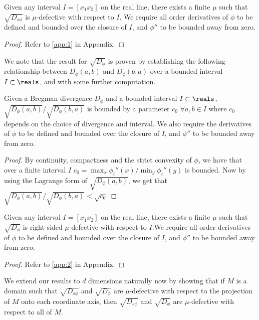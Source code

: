 \documentclass[11pt]{myclass}
\newcommand{\breg}{\ensuremath{D_\phi}}
\newcommand{\sbreg}{\ensuremath{D_{s\phi}}}
\begin{document}
\begin{lemma}\label{Arootmu}
Given any interval $I=[x_1 x_2]$ on the real line, there exists a finite $\mu$ such that  $\sqrt{\sbreg}$ is $\mu$-defective with respect to $I$. We require 
all order derivatives of $\phi$ to be defined and bounded over the closure of $I$, and $\phi''$ to be bounded away from zero.
\end{lemma}

\begin{proof}
Refer to \ref{app:1} in Appendix.
\end{proof}

We note that the result for $\sqrt{\breg}$ is proven by establishing the
 following relationship between $\breg(a,b)$ and $\breg(b,a)$ over a bounded interval $I \subset \reals$, and with some
further computation. 
\begin{lemma}\label{firstTosecond}
Given a Bregman divergence $\breg$ and a bounded interval $I \subset \reals$, $\sqrt{\breg(a,b)}/ \sqrt{\breg(b,a)}$ is 
bounded by a parameter $c_0$  $\forall a,b \in I$ where $c_0$ depends on the choice of divergence and interval. We also require 
the derivatives of $\phi$ to be defined and bounded over the closure of $I$, and $\phi''$ to be bounded away from zero.
\end{lemma}
\begin{proof}
By continuity, compactness and the strict convexity of $\phi$, we have that over a finite interval $I$ $ c_ 0 = \max_x \phi_i'' (x)/  \min_y \phi_i''(y) $ is bounded.
 Now by using the Lagrange form of $\sqrt{\breg(a,b)}$, we get that $\sqrt{\breg(a,b)}/ \sqrt{\breg(b,a)} < \sqrt{c_0}$
\end{proof}

\begin{lemma}\label{Arootmubreg}
Given any interval $I=[x_1 x_2]$ on the real line, there exists a finite $\mu$ such that  $\sqrt{\breg}$ is right-sided $\mu$-defective with respect to $I$.We require all order 
derivatives of $\phi$ to be defined and bounded over the closure of $I$, and $\phi''$ to be bounded away from zero. 
\end{lemma}

\begin{proof}
Refer to \ref{app:2} in Appendix.
\end{proof}

We extend our results to $d$ dimensions naturally now by showing that if $M$ is a domain such that $\sqrt{\sbreg}$ and $\sqrt{\breg}$ are $\mu$-defective with respect to the projection of $M$ onto each coordinate axis, then $\sqrt{\sbreg}$ and $\sqrt{\breg}$ are  $\mu$-defective with respect to all of $M$.  
\end{document}
